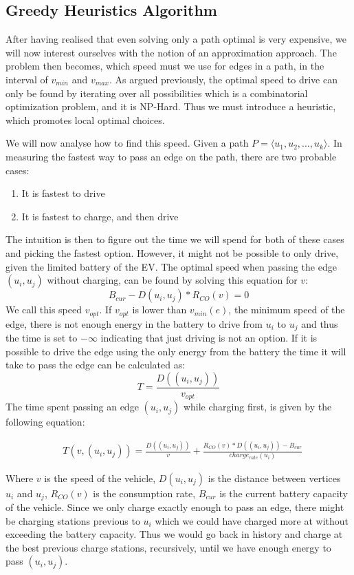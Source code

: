 \subsection{Greedy Heuristics Algorithm}
After having realised that even solving only a path optimal is very expensive, we will now interest ourselves with the notion of an approximation approach. The problem then becomes, which speed must we use for edges in a path, in the interval of $v_{min}$ and $v_{max}$. As argued previously, the optimal speed to drive can only be found by iterating over all possibilities which is a combinatorial optimization problem, and it is NP-Hard. Thus we must introduce a heuristic, which promotes local optimal choices. 

We will now analyse how to find this speed. Given a path $P = \langle u_1,u_2,\dots,u_k \rangle$. In measuring the fastest way to pass an edge on the path, there are two probable cases:
\begin{enumerate}
	\item It is fastest to drive
	\item It is fastest to charge, and then drive
\end{enumerate}

The intuition is then to figure out the time we will spend for both of these cases and picking the fastest option. However, it might not be possible to only drive, given the limited battery of the EV. The optimal speed when passing the edge $(u_i, u_j)$ without charging, can be found by solving this equation for $v$:
\[B_{cur} - D(u_i, u_j) * R_{CO}(v) = 0\] 
We call this speed $v_{opt}$. If $v_{opt}$ is lower than $v_{min}(e)$, the minimum speed of the edge, there is not enough energy in the battery to drive from $u_i$ to $u_j$ and thus the time is set to $-\infty$ indicating that just driving is not an option. If it is possible to drive the edge using the only energy from the battery the time it will take to pass the edge can be calculated as:
 \[T = \frac{D((u_i, u_j))}{v_{opt}} \] 
The time spent passing an edge $(u_i, u_j)$ while charging first, is given by the following equation:

\begin{equation*}
\begin{aligned}
 & T(v,(u_i, u_j)) = \frac{D((u_i, u_j))}{v} + \frac{R_{CO}(v) * D((u_i, u_j)) - B_{cur}}{charge_{rate}(u_i)}
\end{aligned}
\end{equation*}\label{eq:drivingAndCharging}

Where $v$ is the speed of the vehicle, $D(u_i, u_j)$ is the distance between vertices $u_i$ and $u_j$, $R_{CO}(v)$ is the consumption rate, $B_{cur}$ is the current battery capacity of the vehicle. Since we only charge exactly enough to pass an edge, there might be charging stations previous to $u_i$ which we could have charged more at without exceeding the battery capacity. Thus we would go back in history and charge at the best previous charge stations, recursively, until we have enough energy to pass $(u_i, u_j)$.

